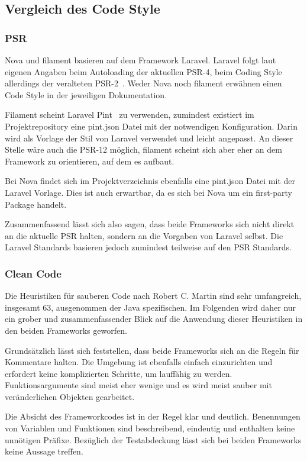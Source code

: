\subsection{Vergleich des Code Style}
\subsubsection{PSR}
Nova und filament basieren auf dem Framework Laravel.
Laravel folgt laut eigenen Angaben beim Autoloading der aktuellen PSR-4, beim Coding Style allerdings der veralteten PSR-2~\cite{laravel-docs-coding-style}.
Weder Nova noch filament erwähnen einen Code Style in der jeweiligen Dokumentation.

Filament scheint Laravel Pint~\cite{laravel-docs-pint} zu verwenden, zumindest existiert im Projektrepository eine pint.json Datei mit der notwendigen Konfiguration.
Darin wird als Vorlage der Stil von Laravel verwendet und leicht angepasst.
An dieser Stelle wäre auch die PSR-12 möglich, filament scheint sich aber eher an dem Framework zu orientieren, auf dem es aufbaut.

Bei Nova findet sich im Projektverzeichnis ebenfalls eine pint.json Datei mit der Laravel Vorlage.
Dies ist auch erwartbar, da es sich bei Nova um ein first-party Package handelt.

Zusammenfassend lässt sich also sagen, dass beide Frameworks sich nicht direkt an die aktuelle PSR halten, sondern an die Vorgaben von Laravel selbst.
Die Laravel Standards basieren jedoch zumindest teilweise auf den PSR Standards.

\subsubsection{Clean Code}
Die Heuristiken für sauberen Code nach Robert C. Martin sind sehr umfangreich, insgesamt 63, ausgenommen der Java spezifischen.
Im Folgenden wird daher nur ein grober und zusammenfassender Blick auf die Anwendung dieser Heuristiken in den beiden Frameworks geworfen.

Grundsätzlich lässt sich feststellen, dass beide Frameworks sich an die Regeln für Kommentare halten.
Die Umgebung ist ebenfalls einfach einzurichten und erfordert keine komplizierten Schritte, um lauffähig zu werden.
Funktionsargumente sind meist eher wenige und es wird meist sauber mit veränderlichen Objekten gearbeitet.

Die Absicht des Frameworkcodes ist in der Regel klar und deutlich.
Benennungen von Variablen und Funktionen sind beschreibend, eindeutig und enthalten keine unnötigen Präfixe.
Bezüglich der Testabdeckung lässt sich bei beiden Frameworks keine Aussage treffen.

